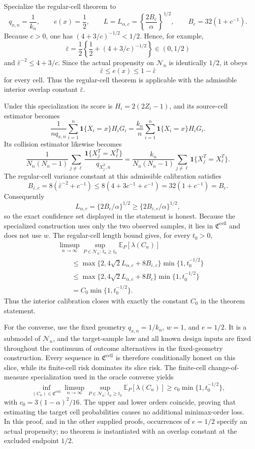 Specialize the regular-cell theorem to
\[
 q_{x,n}=\frac1{k_n},
 \qquad e(x)=\frac12,
 \qquad
 L=L_{\alpha,c}=\left\{\frac{2B_c}{\alpha}\right\}^{1/2},
 \qquad B_c=32(1+c^{-1}).
\]
Because \(c>0\), one has \((4+3/c)^{-1/2}<1/2\).  Hence, for example,
\[
 \bar\varepsilon
 =\frac12\left\{\frac12+(4+3/c)^{-1/2}\right\}
 \in(0,1/2)
\]
and \(\bar\varepsilon^{-2}\le 4+3/c\).  Since the actual propensity on \(\mathcal N_n\) is identically \(1/2\), it obeys
\[
 \bar\varepsilon\le e(x)\le1-\bar\varepsilon
\]
for every cell.  Thus the regular-cell theorem is applicable with the admissible interior overlap constant \(\bar\varepsilon\).

Under this specialization its score is \(H_i=2(2Z_i-1)\), and its source-cell estimator becomes
\[
 \frac1{nq_{x,n}}\sum_{i=1}^n\mathbf 1\{X_i=x\}H_iG_i
 =\frac{k_n}{n}\sum_{i=1}^n\mathbf 1\{X_i=x\}H_iG_i.
\]
Its collision estimator likewise becomes
\[
 \frac1{N_n(N_n-1)}\sum_{j\ne\ell}
 \frac{\mathbf 1\{X_j^T=X_\ell^T\}}{q_{X_j^T,n}}
 =\frac{k_n}{N_n(N_n-1)}\sum_{j\ne\ell}
 \mathbf 1\{X_j^T=X_\ell^T\}.
\]
The regular-cell variance constant at this admissible calibration satisfies
\[
 B_{\bar\varepsilon,c}
 =8(\bar\varepsilon^{-2}+c^{-1})
 \le8(4+3c^{-1}+c^{-1})
 =32(1+c^{-1})
 =B_c.
\]
Consequently
\[
 L_{\alpha,c}
 =\{2B_c/\alpha\}^{1/2}
 \ge\{2B_{\bar\varepsilon,c}/\alpha\}^{1/2},
\]
so the exact confidence set displayed in the statement is honest.  Because the specialized construction uses only the two observed samples, it lies in \(\mathfrak C^{\mathrm{cell}}\) and does not use \(w\).  The regular-cell length bound gives, for every \(t_0>0\),
\[
 \begin{aligned}
 &\limsup_{n\to\infty}
 \sup_{P\in\mathcal N_n:\,t_n\ge t_0}
 \mathbb E_P[\lambda(C_n)]\\
 &\qquad\le
 \max\{2,4\sqrt2L_{\alpha,c}+8B_{\bar\varepsilon,c}\}
 \min\{1,t_0^{-1/2}\}\\
 &\qquad\le
 \max\{2,4\sqrt2L_{\alpha,c}+8B_c\}
 \min\{1,t_0^{-1/2}\}\\
 &\qquad=C_0\min\{1,t_0^{-1/2}\}.
 \end{aligned}
\]
Thus the interior calibration closes with exactly the constant \(C_0\) in the theorem statement.

For the converse, use the fixed geometry \(q_{x,n}=1/k_n\), \(w=1\), and \(e=1/2\).  It is a submodel of \(\mathcal N_n\), and the target-sample law and all known design inputs are fixed throughout the continuum of outcome alternatives in the fixed-geometry construction.  Every sequence in \(\mathfrak C^{\mathrm{cell}}\) is therefore conditionally honest on this slice, while its finite-cell risk dominates its slice risk.  The finite-cell change-of-measure specialization used in the oracle converse yields
\[
 \inf_{(C_n)\in\mathfrak C^{\mathrm{cell}}}
 \limsup_{n\to\infty}
 \sup_{P\in\mathcal N_n:\,t_n\ge t_0}
 \mathbb E_P[\lambda(C_n)]
 \ge c_0\min\{1,t_0^{-1/2}\},
\]
with \(c_0=3(1-\alpha)^2/16\).  The upper and lower orders coincide, proving that estimating the target cell probabilities causes no additional minimax-order loss.  In this proof, and in the other supplied proofs, occurrences of \(e=1/2\) specify an actual propensity; no theorem is instantiated with an overlap constant at the excluded endpoint \(1/2\).